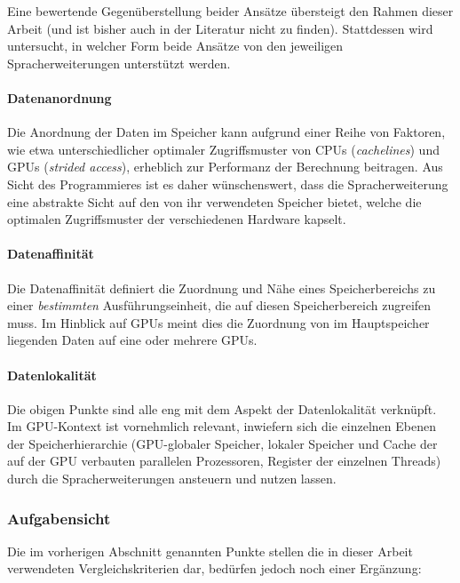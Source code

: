 Eine bewertende Gegenüberstellung beider Ansätze übersteigt den Rahmen dieser
Arbeit (und ist bisher auch in der Literatur nicht zu finden). Stattdessen wird
untersucht, in welcher Form beide Ansätze von den jeweiligen Spracherweiterungen
unterstützt werden.

\paragraph{Datenanordnung}

Die Anordnung der Daten im Speicher kann aufgrund einer Reihe von Faktoren, wie
etwa unterschiedlicher optimaler Zugriffsmuster von CPUs (\textit{cachelines})
und GPUs (\textit{strided access}), erheblich zur Performanz der Berechnung
beitragen. Aus Sicht des Programmieres ist es daher wünschenswert, dass die
Spracherweiterung eine abstrakte Sicht auf den von ihr verwendeten Speicher
bietet, welche die optimalen Zugriffsmuster der verschiedenen Hardware kapselt.

\paragraph{Datenaffinität}

Die Datenaffinität definiert die Zuordnung und Nähe eines Speicherbereichs zu
einer \textit{bestimmten} Ausführungseinheit, die auf diesen Speicherbereich
zugreifen muss. Im Hinblick auf GPUs meint dies die Zuordnung von im
Hauptspeicher liegenden Daten auf eine oder mehrere GPUs.

\paragraph{Datenlokalität}

Die obigen Punkte sind alle eng mit dem Aspekt der Datenlokalität verknüpft.
Im GPU-Kontext ist vornehmlich relevant, inwiefern sich die einzelnen
Ebenen der Speicherhierarchie (GPU-globaler Speicher, lokaler Speicher und Cache
der auf der GPU verbauten parallelen Prozessoren, Register der einzelnen
Threads) durch die Spracherweiterungen ansteuern und nutzen lassen.

\subsubsection{Aufgabensicht}
\label{vergleich:anforderungen:aufgabensicht}

Die im vorherigen Abschnitt genannten Punkte stellen die in dieser Arbeit
verwendeten Vergleichskriterien dar, bedürfen jedoch noch einer Ergänzung:

